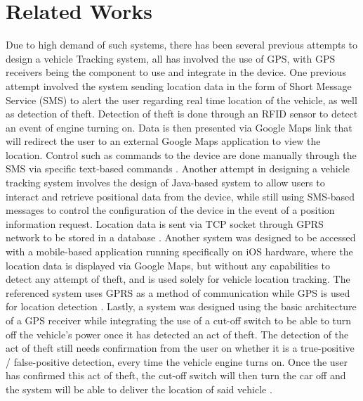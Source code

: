 \documentclass[conference]{IEEEtran}
\begin{document}
\section{Related Works}
Due to high demand of such systems, there has been several previous attempts to design a vehicle Tracking system, all has involved the use of GPS, with GPS receivers being the component to use and integrate in the device. 
One previous attempt involved the system sending location data 
in the form of Short Message Service (SMS) to alert the user regarding real time location of the vehicle, as well as detection of theft. Detection of theft is done through an RFID sensor to detect an event of engine 
turning on. Data is then presented via Google Maps link that will redirect the user to an external Google Maps application to view the location. Control such as commands to the device are done manually through the SMS 
via specific text-based commands \cite{iotmounika}.
Another attempt in designing a vehicle tracking system involves the design of Java-based system to allow users to interact and retrieve positional data from the device, while still using SMS-based messages to control the 
configuration of the device in the event of a position information request. Location data is sent via TCP socket through GPRS network to be stored in a database \cite{6132526}. 
Another system was designed to be accessed with a mobile-based application running specifically on iOS hardware, where the location data is displayed via Google Maps, but without any capabilities to detect any attempt of theft, and is used 
solely for vehicle location tracking. The referenced system uses GPRS as a method of communication while GPS is used for location detection \cite{6803187}.
Lastly, a system was designed using the basic architecture of a GPS receiver while integrating the use of a cut-off switch to be able to turn off
the vehicle's power once it has detected an act of theft. The detection of the act of theft still needs confirmation from the user on whether it is a true-positive / false-positive detection, every time the 
vehicle engine turns on. Once the user has confirmed this act of theft, the cut-off switch will then turn the car off and the system will be able to deliver the location of said vehicle \cite{article1}. 
\end{document}
